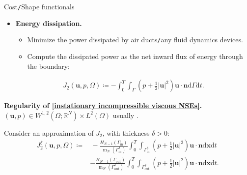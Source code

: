 \documentclass[10pt
hyperref={
    pdfauthor={Hong Quan Ba Nguyen},
    pdftitle={Optimal Shape Design of Air Ducts in Combustion Engines: Design a General Framework},
    pdfsubject={Talk},
    pdfcreator={LaTeX},
}
]{beamer}
\begin{document}
\begin{frame}{Cost\texttt{/}Shape functionals}
    \begin{itemize}
        \item \textbf{Energy dissipation.}
        \begin{itemize}
            \item Minimize the power dissipated by air ducts\texttt{/}any fluid dynamics devices.
            \item Compute the dissipated power as the net inward flux of energy through the boundary:
        \end{itemize}
        \begin{align}
            \label{cost functional: energy dissipation}
            \tag{$J_2$}
            J_2(\textbf{u},p,\Omega)\coloneqq -\int_0^T\int_\Gamma \left(p + \frac{1}{2}|\textbf{u}|^2\right)\textbf{u}\cdot\textbf{n}\textrm{d}\Gamma\textrm{d}t.
        \end{align}
    \end{itemize}
    \textbf{Regularity of \eqref{instationary incompressible viscous NSEs}.} $(\textbf{u},p)\in W^{1,2}(\Omega;\mathbb{R}^N)\times L^2(\Omega)$ usually \cite{MR2009}.
    
    Consider an approximation of $J_2$, with thickness $\delta > 0$:
    \begin{align}
        J_2^\delta(\textbf{u},p,\Omega)\coloneqq&\, -\frac{H_{N-1}(\Gamma_{\textrm{in}})}{\operatorname{m}_N(\Gamma_{\textrm{in}}^\delta)}\int_0^T\int_{\Gamma_{\textrm{in}}^\delta} \left(p + \frac{1}{2}|\textbf{u}|^2\right)\textbf{u}\cdot\textbf{n}\textrm{d}\textbf{x}\textrm{d}t\nonumber\\
        & - \frac{H_{N-1}(\Gamma_{\textrm{out}})}{\operatorname{m}_N(\Gamma_{\textrm{out}}^\delta)}\int_0^T\int_{\Gamma_{\textrm{out}}^\delta} \left(p + \frac{1}{2}|\textbf{u}|^2\right)\textbf{u}\cdot\textbf{n}\textrm{d}\textbf{x}\textrm{d}t.\label{cost functional: approximated energy dissipation}
        \tag{$J_2^\delta$}
    \end{align}
\end{frame}
\end{document}
